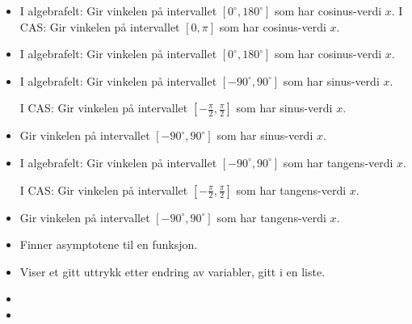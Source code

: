 \begin{itemize}
	
	\item {}
	{
		I algebrafelt: Gir vinkelen på intervallet $ [0^\circ, 180^\circ] $ som har cosinus-verdi $ x $. \os
		I CAS: Gir vinkelen på intervallet $ [0, \pi] $ som har cosinus-verdi $ x $.
	}
	
	\item {}
	{
		I algebrafelt: Gir vinkelen på intervallet $ [0^\circ, 180^\circ] $ som har cosinus-verdi $ x $.
	}
	
	\item {}
	{
		I algebrafelt: Gir vinkelen på intervallet $ [-90^\circ, 90^\circ] $ som har sinus-verdi $ x $.\os
		
		I CAS: Gir vinkelen på intervallet $ [-\frac{\pi}{2}, \frac{\pi}{2}] $ som har sinus-verdi $ x $.
	}
	
	\item {}
	{
		Gir vinkelen på intervallet $ [-90^\circ, 90^\circ] $ som har sinus-verdi $ x $.
	}
	
	\item {}
	{
		I algebrafelt: Gir vinkelen på intervallet $ [-90^\circ, 90^\circ] $ som har tangens-verdi $ x $.\os
		
		I CAS: Gir vinkelen på intervallet $ [-\frac{\pi}{2}, \frac{\pi}{2}] $ som har tangens-verdi $ x $.
	}
	
	\item {}
	{
		Gir vinkelen på intervallet $ [-90^\circ, 90^\circ] $ som har tangens-verdi $ x $.
	}
	
	
	\item {}
	{Finner asymptotene til en funksjon.}
	
	
	

	
	\item {}
	{Viser et gitt uttrykk etter endring av variabler, gitt i en liste.}
	
	\item {}
	
	\item {}
	


\end{itemize}
